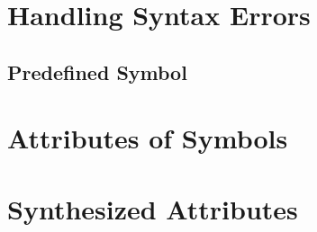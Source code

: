 \section{Handling Syntax Errors}

\subsection{ Predefined Symbol}

\section{Attributes of Symbols}

\section{Synthesized Attributes}

